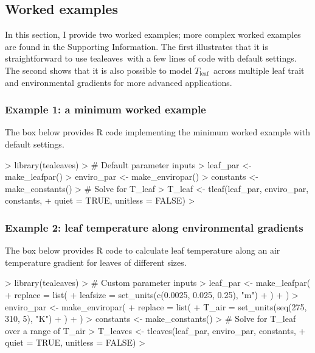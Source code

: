\documentclass[11pt, oneside]{article}
\newcommand{\pkg}[1]{{\fontseries{b}\selectfont #1}}
\newcommand{\tealeaves}{\pkg{tealeaves}}
\newcommand{\tleaf}{$T_\mathrm{leaf}$}
\begin{document}
\subsection*{Worked examples}

In this section, I provide two worked examples; more complex worked examples are found in the Supporting Information. The first illustrates that it is straightforward to use \tealeaves~with a few lines of code with default settings. The second shows that it is also possible to model \tleaf~across multiple leaf trait and environmental gradients for more advanced applications.

\subsubsection*{Example 1: a minimum worked example}

The box below provides R code implementing the minimum worked example with default settings.

\begin{Schunk}
\begin{Sinput}
>   library(tealeaves)
>   # Default parameter inputs  
>   leaf_par   <- make_leafpar()
>   enviro_par <- make_enviropar()
>   constants  <- make_constants()
>   # Solve for T_leaf
>   T_leaf <- tleaf(leaf_par, enviro_par, constants, 
+                   quiet = TRUE, unitless = FALSE)
> 
\end{Sinput}
\end{Schunk}

\subsubsection*{Example 2: leaf temperature along environmental gradients}

The box below provides R code to calculate leaf temperature along an air temperature gradient for leaves of different sizes.

\begin{Schunk}
\begin{Sinput}
>   library(tealeaves)
>   # Custom parameter inputs
>   leaf_par   <- make_leafpar(
+     replace = list(
+       leafsize = set_units(c(0.0025, 0.025, 0.25), "m")
+       )
+   )
>   enviro_par <- make_enviropar(
+     replace = list(
+       T_air = set_units(seq(275, 310, 5), "K")
+       )
+   )
>   constants  <- make_constants()
>   # Solve for T_leaf over a range of T_air
>   T_leaves <- tleaves(leaf_par, enviro_par, constants, 
+                       quiet = TRUE, unitless = FALSE)
> 
\end{Sinput}
\end{Schunk}
\end{document}
